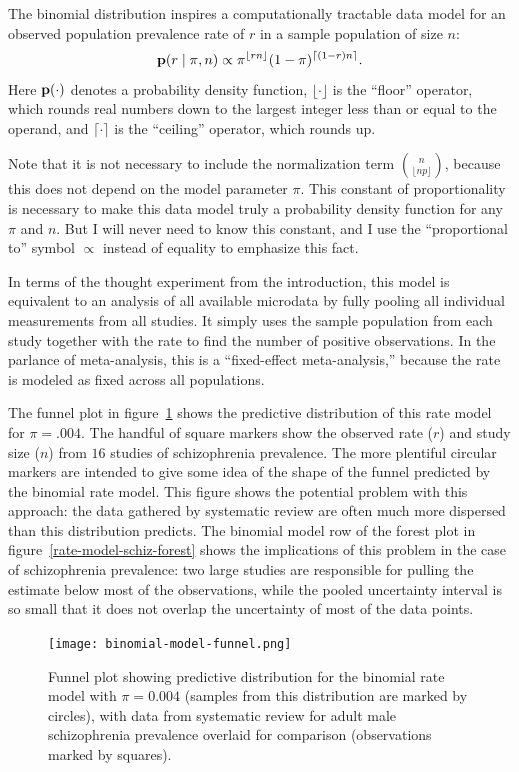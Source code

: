The binomial distribution inspires a computationally tractable
data model for an observed population prevalence rate of
$r$ in a sample population of size $n$:
\[
\mathbf{p}(r\;|\; \pi, n) \propto \pi^{\lfloor rn \rfloor}(1-\pi)^{\lceil (1-r)n \rceil}.
\]
Here $\mathbf{p}(\cdot)$ denotes a probability density function, $\lfloor
\cdot \rfloor$ is the ``floor'' operator, which rounds real numbers
down to the largest integer less than or equal to the operand, and
$\lceil \cdot \rceil$ is the ``ceiling'' operator, which rounds up.

Note that it is not necessary to include the normalization term
$\binom{n}{\lfloor np\rfloor}$, because this does not depend on the
model parameter $\pi$. This constant of proportionality is necessary
to make this data model truly a probability density function for any
$\pi$ and $n$. But I will never need to know this constant, and I use
the ``proportional to'' symbol $\propto$ instead of equality to
emphasize this fact.

In terms of the thought experiment from the introduction, this model
is equivalent to an analysis of all available microdata by fully
pooling all individual measurements from all studies.  It simply
uses the sample population from each study together with the rate to
find the number of positive observations.  In the parlance of
meta-analysis, this is a ``fixed-effect meta-analysis,'' because the
rate is modeled as fixed across all populations.\cite{borenstein_introduction_2011}

The funnel plot in figure~\ref{rate-model-binom-funnel} shows the
predictive distribution of this rate model for $\pi=.004$.  The
handful of square markers show the observed rate ($r$) and study size
($n$) from $16$ studies of schizophrenia prevalence. The more
plentiful circular markers are intended to give some idea of the shape
of the funnel predicted by the binomial rate model.  This figure shows
the potential problem with this approach: the data gathered by
systematic review are often much more dispersed than this distribution
predicts.  The binomial model row of the forest plot in
figure~\ref{rate-model-schiz-forest} shows the implications of this
problem in the case of schizophrenia prevalence: two large studies are
responsible for pulling the estimate below most of the observations,
while the pooled uncertainty interval is so small that it does not
overlap the uncertainty of most of the data points.


\begin{figure}[ht]
\begin{center}
\texttt{[image: binomial-model-funnel.png]}
\end{center}
\caption{Funnel plot showing predictive distribution for the binomial
  rate model with $\pi=0.004$ (samples from this distribution are
  marked by circles), with data from systematic review for adult male
  schizophrenia prevalence overlaid for comparison (observations
  marked by squares).}
\label{rate-model-binom-funnel}
\end{figure}

